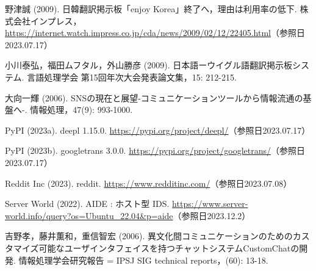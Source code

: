 \documentclass[b5paper,12pt,dvipdfmx]{jsreport}
\begin{document}
\begin{thebibliography}{99}
野津誠 (2009). 日韓翻訳掲示板「enjoy Korea」終了へ，理由は利用率の低下. 株式会社インプレス，\url{https://internet.watch.impress.co.jp/cda/news/2009/02/12/22405.html}（参照日2023.07.17）

小川泰弘，福田ムフタル，外山勝彦 (2009). 日本語ーウイグル語翻訳掲示板システム. 言語処理学会 第15回年次大会発表論文集，15: 212-215.

大向一輝 (2006). SNSの現在と展望-コミュニケーションツールから情報流通の基盤へ-. 情報処理，47(9): 993-1000.

PyPI (2023a). deepl 1.15.0. \url{https://pypi.org/project/deepl/}（参照日2023.07.17）

PyPI (2023b). googletrans 3.0.0. \url{https://pypi.org/project/googletrans/}（参照日2023.07.17）

Reddit Inc (2023). reddit. \url{https://www.redditinc.com/}（参照日2023.07.08）

Server World (2022). AIDE : ホスト型 IDS. \url{https://www.server-world.info/query?os=Ubuntu_22.04&p=aide}（参照日2023.12.2）

吉野孝，藤井薫和，重信智宏 (2006). 異文化間コミュニケーションのためのカスタマイズ可能なユーザインタフェイスを持つチャットシステムCustomChatの開発. 情報処理学会研究報告 = IPSJ SIG technical reports，(60): 13-18.











\end{thebibliography}
\end{document}
